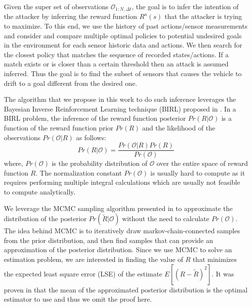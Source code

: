 \documentclass[letterpaper, 10 pt, conference]{ieeeconf}  %
\begin{document}
Given the super set of observations $\mathcal{\mathcal{O}}_{1:N,\Delta t}$, the goal is to infer the intention of the attacker by inferring the reward function $R^a (s)$ that the attacker is trying to maximize. To this end, we use the history of past actions/sensor measurements and consider and compare multiple optimal policies to potential undesired goals in the environment for each sensor historic data and actions. We then search for the closest policy that matches the sequence of recorded states/actions. If a match exists or is closer than a certain threshold then an attack is assumed inferred. Thus the goal is to find the subset of sensors that causes the vehicle to drift to a goal different from the desired one.




The algorithm that we propose in this work to do such inference leverages the Bayesian Inverse Reinforcement Learning technique (BIRL) proposed in \cite{ramachandran2007bayesian}. In a BIRL problem, the inference of the reward function posterior $Pr(R|\mathcal{O})$ is a function of the reward function prior $Pr(R)$ and the likelihood of the observations $Pr(\mathcal{O}|R)$ as follows:
\begin{equation} 
    Pr(R|\mathcal{O}) = \frac{Pr(\mathcal{O}|R)Pr(R)}{Pr(\mathcal{O})}
\end{equation}
where, $Pr(\mathcal{O})$ is the probability distribution of $\mathcal{O}$ over the entire space of reward function $R$. The normalization constant $Pr(\mathcal{O})$ is usually hard to compute as it requires performing multiple integral calculations which are usually not feasible to compute analytically. 

We leverage the MCMC sampling algorithm presented in \cite{andrieu2003introduction} to approximate the distribution of the posterior $Pr(\tilde{R}|\mathcal{O})$ without the need to calculate $Pr(\mathcal{O})$. The idea behind MCMC is to iteratively draw markov-chain-connected samples from the prior distribution, and then find samples that can provide an approximation of the posterior distribution. Since we use MCMC to solve an estimation problem, we are interested in finding the value of $R$ that minimizes the expected least square error (LSE) of the estimate $E[(R-\tilde{R})^2]$. It was proven in \cite{ramachandran2007bayesian} that the mean of the approximated posterior distribution is the optimal estimator to use and thus we omit the proof here.
\end{document}
